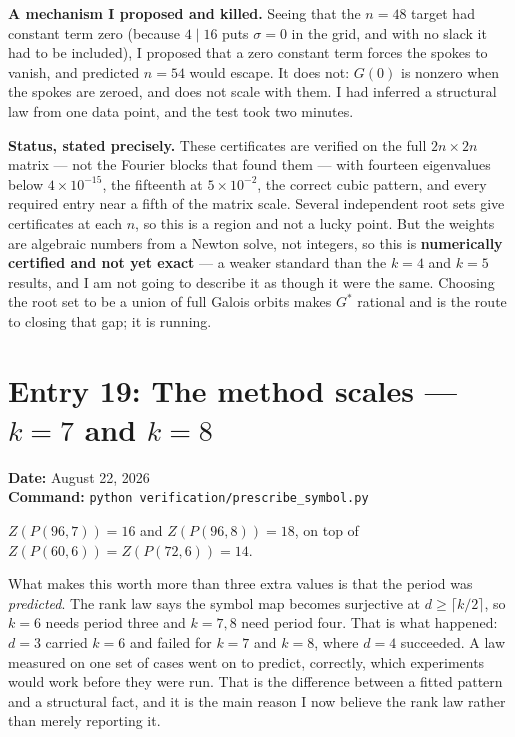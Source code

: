 \documentclass[12pt]{article}
\begin{document}
\textbf{A mechanism I proposed and killed.} Seeing that the $n=48$ target had
constant term zero (because $4\mid16$ puts $\sigma=0$ in the grid, and with no
slack it had to be included), I proposed that a zero constant term forces the
spokes to vanish, and predicted $n=54$ would escape. It does not: $G(0)$ is
nonzero when the spokes are zeroed, and does not scale with them. I had
inferred a structural law from one data point, and the test took two minutes.

\textbf{Status, stated precisely.} These certificates are verified on the full
$2n\times2n$ matrix --- not the Fourier blocks that found them --- with fourteen
eigenvalues below $4\times10^{-15}$, the fifteenth at $5\times10^{-2}$, the
correct cubic pattern, and every required entry near a fifth of the matrix
scale. Several independent root sets give certificates at each $n$, so this is
a region and not a lucky point. But the weights are algebraic numbers from a
Newton solve, not integers, so this is \textbf{numerically certified and not
yet exact} --- a weaker standard than the $k=4$ and $k=5$ results, and I am not
going to describe it as though it were the same. Choosing the root set to be a
union of full Galois orbits makes $G^\ast$ rational and is the route to closing
that gap; it is running.


\clearpage
\section*{Entry 19: The method scales --- $k=7$ and $k=8$}
\textbf{Date:} August 22, 2026\\
\textbf{Command:} {\small\texttt{python verification/prescribe\_symbol.py}}

$Z(P(96,7))=16$ and $Z(P(96,8))=18$, on top of $Z(P(60,6))=Z(P(72,6))=14$.

What makes this worth more than three extra values is that the period was
\emph{predicted}. The rank law says the symbol map becomes surjective at
$d\ge\lceil k/2\rceil$, so $k=6$ needs period three and $k=7,8$ need period
four. That is what happened: $d=3$ carried $k=6$ and failed for $k=7$ and
$k=8$, where $d=4$ succeeded. A law measured on one set of cases went on to
predict, correctly, which experiments would work before they were run. That is
the difference between a fitted pattern and a structural fact, and it is the
main reason I now believe the rank law rather than merely reporting it.
\end{document}
